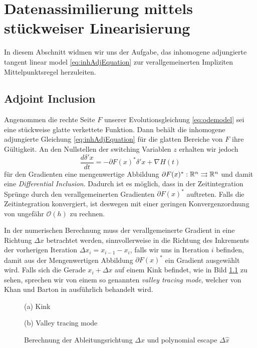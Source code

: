 % 
\chapter{Datenassimilierung mittels stückweiser Linearisierung}
In diesem Abschnitt widmen wir uns der Aufgabe, das inhomogene adjungierte tangent linear model \eqref{eq:inhAdjEquation} zur verallgemeinerten Impliziten Mittelpunktsregel herzuleiten.

\section{Adjoint Inclusion}
\label{sec:adjointInclusion}
Angenommen die rechte Seite $F$ unserer Evolutionsgleichung \eqref{eq:odemodel} sei eine stückweise glatte verkettete Funktion. Dann behält die inhomogene adjungierte Gleichung \eqref{eq:inhAdjEquation} für die glatten Bereiche von $F$ ihre Gültigkeit. An den Nullstellen der switching Variablen $z$ erhalten wir jedoch
\begin{equation}
 \label{eq:adjInclusion}
 \frac{d \delta' x}{dt} =- \partial F(x)^*\delta'x + \nabla H(t)
\end{equation}
für den Gradienten eine mengenwertige Abbildung $\partial F(x)^*:\mathbb{R}^n\rightrightarrows \mathbb{R}^n$ und damit eine \textit{Differential Inclusion}.
Dadurch ist es möglich, dass in der Zeitintegration Sprünge durch den verallgemeinerten Gradienten $\partial F(x)^*$ auftreten. Falls die Zeitintegration konvergiert, ist deswegen mit einer geringen Konvergenzordnung von ungefähr $\mathcal O(h)$ zu rechnen.

In der numerischen Berechnung muss der verallgemeinerte Gradient in eine Richtung $\Delta x$ betrachtet werden, sinnvollerweise in die Richtung des Inkrements der vorherigen Iteration $\Delta x_i = x_{i-1} - x_i$, falls wir uns in Iteration $i$ befinden, damit aus der Mengenwertigen Abbildung $ \partial F(x)^*$ ein Gradient ausgewählt wird. 
Falls sich die Gerade $x_i + \Delta x$ auf einem Kink befindet, wie in Bild \ref{fig:adjValleyTracing} zu sehen, sprechen wir von einem so genannten \textit{valley tracing mode}, welcher von Khan und Barton in \cite{khan2014} ausführlich behandelt wird. 
\begin{figure}
\centering
\begin{minipage}[b]{0.49\linewidth}
\centering

\caption*{(a) Kink}
\end{minipage}
\begin{minipage}[b]{0.49\linewidth}
\centering

\caption*{(b) Valley tracing mode}
\end{minipage}
\caption{Berechnung der Ableitungsrichtung $\Delta x$ und polynomial escape $\Delta \hat x$ }
\label{fig:adjValleyTracing}
\end{figure}

